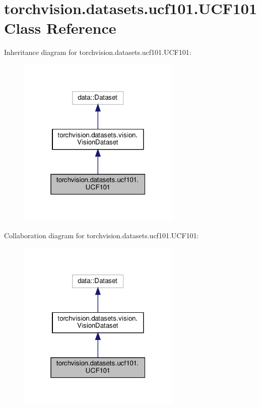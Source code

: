 \hypertarget{classtorchvision_1_1datasets_1_1ucf101_1_1UCF101}{}\section{torchvision.\+datasets.\+ucf101.\+U\+C\+F101 Class Reference}
\label{classtorchvision_1_1datasets_1_1ucf101_1_1UCF101}


Inheritance diagram for torchvision.\+datasets.\+ucf101.\+U\+C\+F101\+:
\nopagebreak
\begin{figure}[H]
\begin{center}
\leavevmode
\includegraphics[width=220pt]{classtorchvision_1_1datasets_1_1ucf101_1_1UCF101__inherit__graph}
\end{center}
\end{figure}


Collaboration diagram for torchvision.\+datasets.\+ucf101.\+U\+C\+F101\+:
\nopagebreak
\begin{figure}[H]
\begin{center}
\leavevmode
\includegraphics[width=220pt]{classtorchvision_1_1datasets_1_1ucf101_1_1UCF101__coll__graph}
\end{center}
\end{figure}
